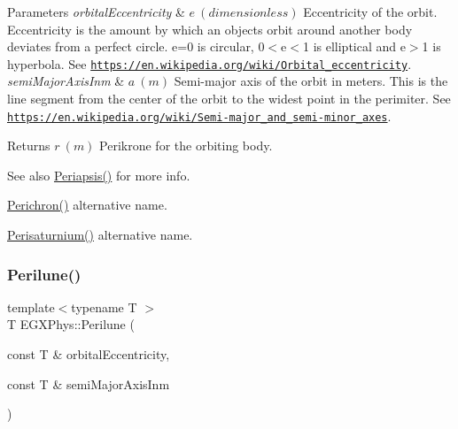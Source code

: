 \begin{DoxyParams}{Parameters}
{\em orbital\+Eccentricity} & $ e\ (dimensionless)$ Eccentricity of the orbit. Eccentricity is the amount by which an objects orbit around another body deviates from a perfect circle. e=0 is circular, 0$<$e$<$1 is elliptical and e$>$1 is hyperbola. See \href{https://en.wikipedia.org/wiki/Orbital_eccentricity}{\tt https\+://en.\+wikipedia.\+org/wiki/\+Orbital\+\_\+eccentricity}. \\
\hline
{\em semi\+Major\+Axis\+Inm} & $ a\ (m)$ Semi-\/major axis of the orbit in meters. This is the line segment from the center of the orbit to the widest point in the perimiter. See \href{https://en.wikipedia.org/wiki/Semi-major_and_semi-minor_axes}{\tt https\+://en.\+wikipedia.\+org/wiki/\+Semi-\/major\+\_\+and\+\_\+semi-\/minor\+\_\+axes}. \\
\hline
\end{DoxyParams}
\begin{DoxyReturn}{Returns}
$ r\ (m)$ Perikrone for the orbiting body. 
\end{DoxyReturn}
\begin{DoxySeeAlso}{See also}
\mbox{\hyperlink{group___e_g_x_phys-_periapsis_gad487212733711bc2ce73c8137c9309c3}{Periapsis()}} for more info. 

\mbox{\hyperlink{group___e_g_x_phys-_periapsis_gae8dfb0b7ebcd117ba94f2d1a7b2e13ad}{Perichron()}} alternative name. 

\mbox{\hyperlink{group___e_g_x_phys-_periapsis_ga9e41853412b564c33a192f7335e4f6fe}{Perisaturnium()}} alternative name. 
\end{DoxySeeAlso}
\mbox{\label{group___e_g_x_phys-_periapsis_gac305fe72a19c1126bc7e72ef1de873a0}} 
\subsubsection{\texorpdfstring{Perilune()}{Perilune()}}
{\footnotesize\ttfamily template$<$typename T $>$ \\
T E\+G\+X\+Phys\+::\+Perilune (\begin{DoxyParamCaption}\item[{const T \&}]{orbital\+Eccentricity,  }\item[{const T \&}]{semi\+Major\+Axis\+Inm }\end{DoxyParamCaption})}



